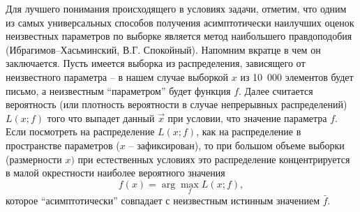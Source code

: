 \begin{ordre}
Для лучшего понимания происходящего в условиях задачи, отметим, что одним из 
самых универсальных способов получения асимптотически наилучших оценок 
неизвестных параметров по выборке является метод наибольшего правдоподобия 
(Ибрагимов--Хасьминский, В.Г. Спокойный). Напомним вкратце в чем он 
заключается. Пусть имеется выборка из распределения, зависящего от 
неизвестного параметра -- в нашем случае выборкой $ {x}$ из 10~000 
элементов будет письмо, а неизвестным ``параметром'' будет функция $f$. 
Далее считается вероятность (или плотность вероятности в случае непрерывных 
распределений) $L\left( { {x};f} \right)$ того что выпадет данный $\vec 
{x}$ при условии, что значение параметра $f$. Если посмотреть на 
распределение $L\left( { {x};f} \right)$, как на распределение в 
пространстве параметров ($ {x}$ -- зафиксирован), то при большом объеме 
выборки (размерности $ {x})$ при естественных условиях это распределение 
концентрируется в малой окрестности наиболее вероятного значения
\[
f\left( {{x}} \right)=\arg \mathop {\max }\limits_f L\left( { 
{x};f} \right),
\]
которое ``асимптотически'' совпадает с неизвестным истинным значением $\bar 
{f}$.

\end{ordre}

